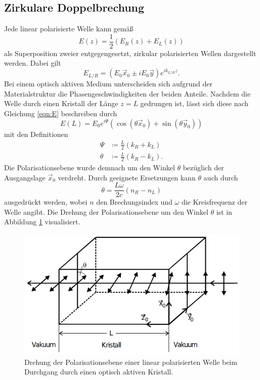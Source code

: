 \subsection{Zirkulare Doppelbrechung}
\label{sec:Doppelbrechung}
Jede linear polarisierte Welle kann gemäß
\begin{equation}
    E(z)=\frac{1}{2}(E_R(z)+E_L(z))
    \label{eqn:E}   
\end{equation}
als Superposition zweier entgegengesetzt, zirkular polarisierten Wellen dargestellt werden. Dabei gilt
\begin{equation*}
    E_{L/R}=(E_0\vec{x}_0\pm iE_0\vec{y})e^{ik_{L/R}z} .
\end{equation*}
Bei einem optisch aktiven Medium unterscheiden sich aufgrund der Materialstruktur die Phasengeschwindigkeiten der beiden Anteile.
Nachdem die Welle durch einen Kristall der Länge $z=L$ gedrungen ist, lässt sich diese nach Gleichung \ref{eqn:E} beschreiben durch
\begin{equation*}
    E(L)=E_0e^{i\Psi}(\cos{(\theta\vec{x}_0)}+\sin{(\theta\vec{y}_0)})
\end{equation*}
mit den Definitionen
\begin{align*}
    \Psi  &\coloneqq \frac{L}{2}(k_R+k_L)\\
    \theta&\coloneqq \frac{L}{2}(k_R-k_L) .
\end{align*}
Die Polarisationsebene wurde demnach um den Winkel $\theta$ bezüglich der Ausgangslage $\vec{x}_0$ verdreht. Durch geeignete 
Ersetzungen kann $\theta$ auch durch 
\begin{equation*}
    \theta=\frac{L\omega}{2c}(n_R-n_L)
\end{equation*}
ausgedrückt werden, wobei $n$ den Brechungsindex und $\omega$ die Kreisfrequenz der Welle angibt. Die Drehung der Polarisationsebene
um den Winkel $\theta$ ist in Abbildung \ref{fig:Doppelbrechung} visualisiert.
\begin{figure}[H]
    \centering
    \includegraphics[scale=0.6]{pictures/Doppelbrechung.png}
    \caption{Drehung der Polarisationsebene einer linear polarisierten Welle beim Durchgang durch einen optisch aktiven Kristall. \cite{Anhang}}
    \label{fig:Doppelbrechung}
\end{figure}
